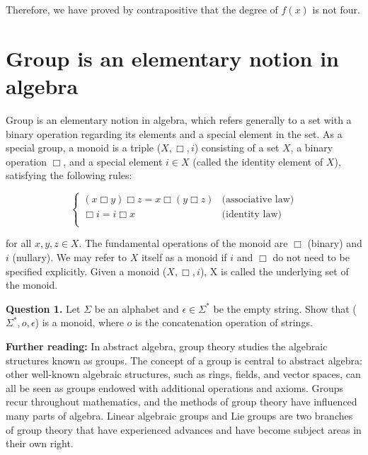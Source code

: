 \documentclass{article}
\begin{document}
Therefore, we have proved by contrapositive that the degree of $f(x)$ is not four.

\section{Group is an elementary notion in algebra}

Group is an elementary notion in algebra, which refers generally to a set with a binary operation regarding its elements and a special element in the set. As a special group, a monoid is a triple ($X, \Box , i$) consisting of a set $X$, a binary operation $\Box$, and a special element $i \in X$ (called the identity element of $X$), satisfying the following rules:

\begin{equation*}
  \left\{
    \begin{array}{ll}
      (x \Box y)\Box z = x \Box(y \Box z) &\text{(associative law)} \\
      \Box i = i \Box x &\text{(identity law)}\\
    \end{array} 
  \right.
\end{equation*}

for all $x, y, z \in X$. The fundamental operations of the monoid are $\Box$ (binary) and $i$ (nullary). We may refer to $X$ itself as a monoid if $i$ and $\Box$ do not need to be specified explicitly. Given a monoid ($X, \Box, i$), X is called the underlying set of the monoid.

\textbf{Question 1.} Let $\Sigma$ be an alphabet and $\epsilon \in \Sigma^*$ be the empty string. Show that ($\Sigma^*, o , \epsilon$) is a monoid, where $o$ is the concatenation operation of strings.

\begin{tcolorbox}
  \textbf{Further reading:} In abstract algebra, group theory studies the algebraic structures known as groups. The concept of a group is central to abstract algebra: other well-known algebraic structures, such as rings, fields, and vector spaces, can all be seen as groups endowed with additional operations and axioms. Groups recur throughout mathematics, and the methods of group theory have influenced many parts of algebra. Linear algebraic groups and Lie groups are two branches of group theory that have experienced advances and have become subject areas in their own right.
\end{tcolorbox}
\end{document}
